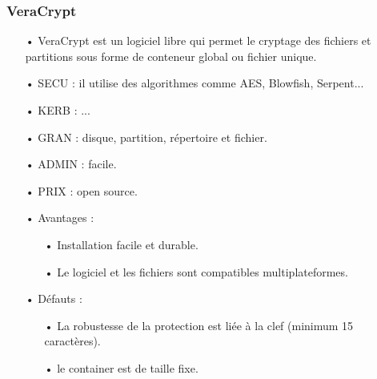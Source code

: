 \documentclass[10pt,a4paper]{beamer}
\begin{document}
\begin{frame}
  \frametitle{VeraCrypt}
 \begin{itemize}
\item[•] VeraCrypt est un logiciel libre qui permet le cryptage des fichiers et partitions sous forme de conteneur global ou fichier unique.
\item[•] SECU : il utilise des algorithmes comme AES, Blowfish, Serpent...
\item[•] KERB : ...
\item[•] GRAN : disque, partition, répertoire et fichier.
\item[•] ADMIN : facile.
\item[•] PRIX : open source.
\item[•] Avantages : 
\begin{itemize}
\item[•] Installation facile et durable.
\item[•] Le logiciel et les fichiers sont compatibles multiplateformes.
\end{itemize}
\item[•] Défauts  : 
\begin{itemize}
\item[•] La robustesse de la protection est liée à la clef (minimum 15 caractères).
\item[•] le container est de taille fixe.
\end{itemize}
\end{itemize} 
  
\end{frame}
\end{document}

